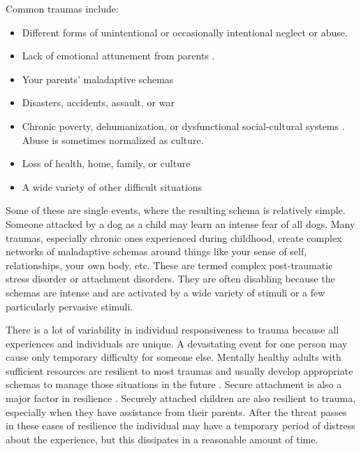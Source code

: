 \documentclass[12pt,letterpaper]{book}
\begin{document}
Common traumas include:
\begin{itemize}
    \item Different forms of unintentional or occasionally intentional neglect or abuse.
    \item Lack of emotional attunement from parents \cite{brownAttachmentDisturbances}.
    \item Your parents' maladaptive schemas
    \item Disasters, accidents, assault, or war
    \item Chronic poverty, dehumanization, or dysfunctional social-cultural systems \cite{roncaStructuralViolence}. Abuse is sometimes normalized as culture.
    \item Loss of health, home, family, or culture
    \item A wide variety of other difficult situations
\end{itemize}
Some of these are single events, where the resulting schema is relatively simple. Someone attacked by a dog as a child may learn an intense fear of all dogs. Many traumas, especially chronic ones experienced during childhood, create complex networks of maladaptive schemas around things like your sense of self, relationships, your own body, etc. These are termed complex post-traumatic stress disorder or attachment disorders. They are often disabling because the schemas are intense and are activated by a wide variety of stimuli or a few particularly pervasive stimuli.

There is a lot of variability in individual responsiveness to trauma because all experiences and individuals are unique. A devastating event for one person may cause only temporary difficulty for someone else. Mentally healthy adults with sufficient resources are resilient to most traumas and usually develop appropriate schemas to manage those situations in the future \cite{bonanno2008loss}. Secure attachment is also a major factor in resilience . Securely attached children are also resilient to trauma, especially when they have assistance from their parents. After the threat passes in these cases of resilience the individual may have a temporary period of distress about the experience, but this dissipates in a reasonable amount of time.
\end{document}
